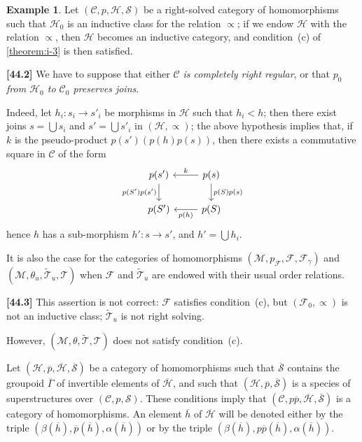 \documentclass[a4paper,fleqn]{article}
\theoremstyle{plain}
\theoremstyle{definition}
\newtheorem*{example}{Example}
\newenvironment{longcomm}[1]
  {\noindent\textbf{[#1]}\rmfamily}
  {}
\newcommand{\oldpage}[1]{{\marginpar{\footnotesize$\bigg\vert$\,\,\,\,\textit{p.~#1}}}}
\newcommand{\CC}{\mathcal{C}}
\newcommand{\HH}{\mathcal{H}}
\newcommand{\bHH}{\overline{\HH}}
\renewcommand{\SS}{\mathcal{S}}
\newcommand{\bSS}{\overline{\SS}}
\newcommand{\MM}{\mathcal{M}}
\newcommand{\FF}{\mathcal{F}}
\newcommand{\TT}{\mathcal{T}}
\newcommand{\tTT}{\widetilde{\TT}}
\newcommand{\subs}{\mathrel{\propto}}
\begin{document}
\begin{example}
  Let $(\CC,p,\HH,\SS)$ be a right-solved category of homomorphisms such that $\HH_0$ is an inductive class \cite{3a} for the relation $\subs$;
  if we endow $\HH$ with the relation $\subs$, then $\HH$ becomes an inductive category, and condition~(c) of \cref{theorem:i-3} is then satisfied.

  \begin{longcomm}{44.2}
    We have to suppose that either \emph{$\CC$ is completely right regular}, or that \emph{$p_0$ from $\HH_0$ to $\CC_0$ preserves joins}.

    Indeed, let $h_i\colon s_i\to s'_i$ be morphisms in $\HH$ such that $h_i<h$;
    then there exist joins $s=\bigcup s_i$ and $s'=\bigcup s'_i$ in $(\HH,\subs)$;
    the above hypothesis implies that, if $k$ is the pseudo-product $p(s')(p(h)p(s))$, then there exists a commutative square in $\CC$ of the form
    \[
      \begin{tikzcd}
        p(s')
          \ar[d,swap,"p(S')p(s')"]
        & p(s)
          \ar[l,swap,"k"]
          \ar[d,"p(S)p(s)"]
      \\p(S')
        & p(S)
          \ar[l,"p(h)"]
      \end{tikzcd}
    \]
    hence $h$ has a sub-morphism $h'\colon s\to s'$, and $h'=\bigcup h_i$.
  \end{longcomm}

  It is also the case for the categories of homomorphisms $(\MM,p_\FF,\FF,\FF_\gamma)$ and $(\MM,\theta_u,\tTT_u,\TT)$ when $\FF$ and $\tTT_u$ are endowed with their usual order relations.

  \begin{longcomm}{44.3}
    This assertion is not correct: $\FF$ satisfies condition~(c), but $(\FF_0,\subs)$ is not an inductive class; $\tTT_u$ is not right solving.
  \end{longcomm}

  However, $(\MM,\theta,\tTT,\TT)$ does not satisfy condition~(c).
\end{example}

Let $(\HH,\overline{p},\bHH,\bSS)$ be a category of homomorphisms such that $\bSS$ contains the groupoid $\overline{\Gamma}$ of invertible elements of $\bHH$, and such that $(\HH,\overline{p},\bSS)$ is a species of superstructures \cite{3a} over $(\CC,p,\SS)$.
\oldpage{373}
These conditions imply that $(\CC,p\overline{p},\bHH,\bSS)$ is a category of homomorphisms.
An element $\overline{h}$ of $\bHH$ will be denoted either by the triple $(\beta(\overline{h}),\overline{p}(\overline{h}),\alpha(\overline{h}))$ or by the triple $(\beta(\overline{h}),p\overline{p}(\overline{h}),\alpha(\overline{h}))$.
\end{document}
